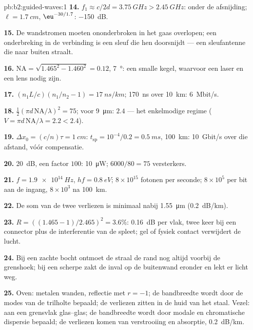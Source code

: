 \begin{solution}{pb:b2:guided-waves:1}
\textbf{14.} $f_1 \approx c/2d = \qty{3.75}{GHz} > \qty{2.45}{GHz}$: onder
de afsnijding; $\ell =
\qty{1.7}{cm}$, $\eu^{-30/1.7}$: \qty{-150}{dB}.

\textbf{15.} De wandstromen moeten ononderbroken in het gaas overlopen; een
onderbreking in de verbinding is een sleuf die hen doorsnijdt --- een
sleufantenne die naar buiten straalt.

\textbf{16.} $\mathrm{NA} = \sqrt{1.465^2 - 1.460^2} = 0.12$,
\qty{7}{\degree}: een smalle kegel, waarvoor een laser en een lens nodig
zijn.

\textbf{17.} $(n_1L/c)(n_1/n_2 - 1) = \qty{17}{ns/km}$; \qty{170}{ns} over
\qty{10}{km}: \qty{6}{Mbit/s}.

\textbf{18.} $\tfrac12(\pi d\,\mathrm{NA}/\lambda)^2 = 75$; voor
\qty{9}{\micro m}: $2.4$ --- het enkelmodige regime
($V = \pi d\,\mathrm{NA}/\lambda = 2.2 < 2.4$).

\textbf{19.} $\Delta x_0 = (c/n)\tau = \qty{1}{cm}$:
$t_{\text{sp}} = 10^{-4}/0.2 = \qty{0.5}{ms}$, \qty{100}{km}:
\qty{10}{Gbit/s} over die afstand, vóór compensatie.

\textbf{20.} \qty{20}{dB}, een factor $100$: \qty{10}{\micro W};
$6000/80 = 75$ versterkers.

\textbf{21.} $f = \qty{1.9e14}{Hz}$, $hf = \qty{0.8}{eV}$;
$8 \times 10^{15}$ fotonen per seconde; $8 \times 10^5$ per bit aan de
ingang, $8 \times 10^3$ na \qty{100}{km}.

\textbf{22.} De som van de twee verliezen is minimaal nabij
\qty{1.55}{\micro m} (\qty{0.2}{dB/km}).

\textbf{23.} $R = ((1.465 - 1)/2.465)^2 = 3.6\%$: \qty{0.16}{dB} per vlak,
twee keer bij een connector plus de interferentie van de spleet; gel of
fysiek contact verwijdert de lucht.

\textbf{24.} Bij een zachte bocht ontmoet de straal de rand nog altijd
voorbij de grenshoek; bij een scherpe zakt de inval op de buitenwand eronder
en lekt er licht weg.

\textbf{25.} Oven: metalen wanden, reflectie met $r = -1$; de bandbreedte
wordt door de modes van de trilholte bepaald; de verliezen zitten in de huid
van het staal. Vezel:  aan een grensvlak
glas--glas; de bandbreedte wordt door modale en chromatische dispersie
bepaald; de verliezen komen van verstrooiing en absorptie, \qty{0.2}{dB/km}.
\end{solution}
